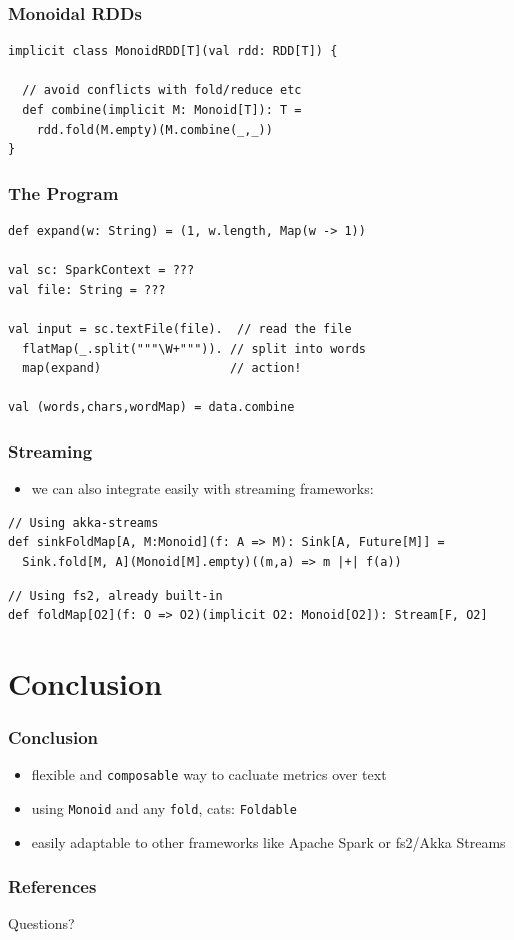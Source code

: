 \documentclass[aspectratio=169]{beamer}
\begin{document}
\begin{frame}[fragile]
  \frametitle{Monoidal RDDs}
\begin{verbatim}
implicit class MonoidRDD[T](val rdd: RDD[T]) {

  // avoid conflicts with fold/reduce etc
  def combine(implicit M: Monoid[T]): T =
    rdd.fold(M.empty)(M.combine(_,_))
}
\end{verbatim}
\end{frame}

\begin{frame}
  \frametitle{The Program}
\begin{verbatim}
def expand(w: String) = (1, w.length, Map(w -> 1))

val sc: SparkContext = ???
val file: String = ???

val input = sc.textFile(file).  // read the file
  flatMap(_.split("""\W+""")). // split into words
  map(expand)                  // action!

val (words,chars,wordMap) = data.combine
\end{verbatim}
\end{frame}

\begin{frame}[fragile]
  \frametitle{Streaming}
  \begin{itemize}
  \item we can also integrate easily with streaming frameworks:
  \end{itemize}
  \vspace{4mm}
  \begin{verbatim}
// Using akka-streams
def sinkFoldMap[A, M:Monoid](f: A => M): Sink[A, Future[M]] =
  Sink.fold[M, A](Monoid[M].empty)((m,a) => m |+| f(a))
  \end{verbatim}
  \vspace{4mm}
  \begin{verbatim}
// Using fs2, already built-in
def foldMap[O2](f: O => O2)(implicit O2: Monoid[O2]): Stream[F, O2]
  \end{verbatim}
\end{frame}

\section{Conclusion}

\begin{frame}
  \frametitle{Conclusion}
  \begin{itemize}
  \item flexible and \texttt{composable} way to cacluate metrics over
    text
  \item using \texttt{Monoid} and any \texttt{fold}, cats:
    \texttt{Foldable}
  \item easily adaptable to other frameworks like Apache Spark or
    fs2/Akka Streams
  \end{itemize}
\end{frame}

\begin{frame}
  \frametitle{References}
  \begin{center}
    {
      \Huge{}Questions?
    }
  \end{center}
\end{frame}
\end{document}
